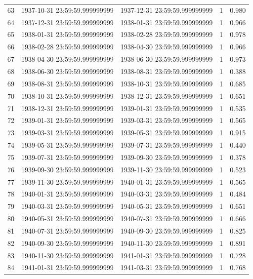\begin{table}
\begin{tabular}{lcccc}
63 & 1937-10-31 23:59:59.999999999 & 1937-12-31 23:59:59.999999999 & 1 & 0.980 \\
64 & 1937-12-31 23:59:59.999999999 & 1938-01-31 23:59:59.999999999 & 1 & 0.966 \\
65 & 1938-01-31 23:59:59.999999999 & 1938-02-28 23:59:59.999999999 & 1 & 0.978 \\
66 & 1938-02-28 23:59:59.999999999 & 1938-04-30 23:59:59.999999999 & 1 & 0.966 \\
67 & 1938-04-30 23:59:59.999999999 & 1938-06-30 23:59:59.999999999 & 1 & 0.973 \\
68 & 1938-06-30 23:59:59.999999999 & 1938-08-31 23:59:59.999999999 & 1 & 0.388 \\
69 & 1938-08-31 23:59:59.999999999 & 1938-10-31 23:59:59.999999999 & 1 & 0.685 \\
70 & 1938-10-31 23:59:59.999999999 & 1938-12-31 23:59:59.999999999 & 1 & 0.651 \\
71 & 1938-12-31 23:59:59.999999999 & 1939-01-31 23:59:59.999999999 & 1 & 0.535 \\
72 & 1939-01-31 23:59:59.999999999 & 1939-03-31 23:59:59.999999999 & 1 & 0.565 \\
73 & 1939-03-31 23:59:59.999999999 & 1939-05-31 23:59:59.999999999 & 1 & 0.915 \\
74 & 1939-05-31 23:59:59.999999999 & 1939-07-31 23:59:59.999999999 & 1 & 0.440 \\
75 & 1939-07-31 23:59:59.999999999 & 1939-09-30 23:59:59.999999999 & 1 & 0.378 \\
76 & 1939-09-30 23:59:59.999999999 & 1939-11-30 23:59:59.999999999 & 1 & 0.523 \\
77 & 1939-11-30 23:59:59.999999999 & 1940-01-31 23:59:59.999999999 & 1 & 0.565 \\
78 & 1940-01-31 23:59:59.999999999 & 1940-03-31 23:59:59.999999999 & 1 & 0.484 \\
79 & 1940-03-31 23:59:59.999999999 & 1940-05-31 23:59:59.999999999 & 1 & 0.651 \\
80 & 1940-05-31 23:59:59.999999999 & 1940-07-31 23:59:59.999999999 & 1 & 0.666 \\
81 & 1940-07-31 23:59:59.999999999 & 1940-09-30 23:59:59.999999999 & 1 & 0.825 \\
82 & 1940-09-30 23:59:59.999999999 & 1940-11-30 23:59:59.999999999 & 1 & 0.891 \\
83 & 1940-11-30 23:59:59.999999999 & 1941-01-31 23:59:59.999999999 & 1 & 0.728 \\
84 & 1941-01-31 23:59:59.999999999 & 1941-03-31 23:59:59.999999999 & 1 & 0.768 \\

\end{tabular}
\end{table}
